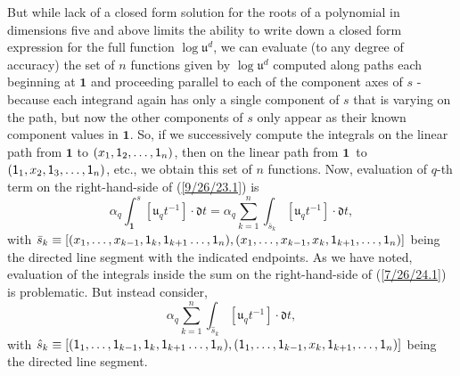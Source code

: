 \documentclass{amsart}
\numberwithin{equation}{section}
\theoremstyle{definition}
\numberwithin{theorem}{section}
\begin{document}
But while lack of a closed form solution for the roots of a polynomial in dimensions five and above limits the ability to write down a closed form expression for the full function $\log\mathfrak{u}^d$, we can evaluate (to any degree of accuracy) the set of $n$ functions given by $\log\mathfrak{u}^d$ computed along paths each beginning at $\mathbf{1}$ and proceeding parallel to each of the component axes of $s$ - because each integrand again has only a single component of $s$ that is varying on the path, but now the other components of $s$ only appear as their known component values in $\mathbf{1}$.  
So, if we successively compute the integrals on the linear path from $\mathbf{1}$ to $(x_1,{\sf 1}_2,\dots,{\sf 1}_n)$, then on the linear path from \mbox{$\mathbf{1}$ to} $({\sf 1}_1,x_2,{\sf 1}_3,\dots,{\sf 1}_n)$, etc., we obtain this set of $n$ functions. 
 Now, evaluation of $q$-th term on the right-hand-side of (\ref{9/26/23.1}) is \begin{equation}\label{7/26/24.1} \alpha_q\int_{\mathbf{1}}^s [\mathfrak{u}_q t^{-1}]\cdot \mathfrak{d}t = \alpha_q\sum_{k=1}^n \int_{\bar{s}_k} [\mathfrak{u}_q t^{-1}]\cdot \mathfrak{d}t,\end{equation} with $\bar{s}_k \equiv [(x_1,\dots,x_{k-1},{\sf 1}_{k},{\sf 1}_{k+1}\dots,{\sf 1}_n),(x_1,\dots,x_{k-1},x_k,{\sf 1}_{k+1},\dots,{\sf 1}_n)]$ being the directed line segment with the indicated endpoints.   As we have noted, evaluation of the integrals inside the sum on the right-hand-side of (\ref{7/26/24.1}) is problematic.  But instead consider,  \begin{equation}\label{7/26/24.2}\alpha_q\sum_{k=1}^n \int_{\hat{s}_k} [\mathfrak{u}_q t^{-1}]\cdot \mathfrak{d}t,\end{equation} with $\hat{s}_k \equiv [({\sf 1}_1,\dots,{\sf 1}_{k-1},{\sf 1}_{k},{\sf 1}_{k+1}\dots,{\sf 1}_n),({\sf 1}_1,\dots,{\sf 1}_{k-1},x_k,{\sf 1}_{k+1},\dots,{\sf 1}_n)]$ being the directed line segment. 
\end{document}
